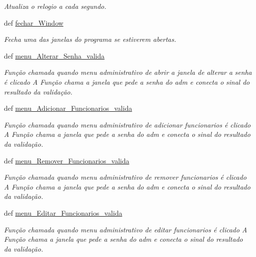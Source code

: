 \begin{DoxyCompactItemize}
\begin{DoxyCompactList}\small\item\em \-Atualiza o relogio a cada segundo. \end{DoxyCompactList}\item 
def \hyperlink{classview_1_1Controle__De__Acesso__Window_acefc417c66ea7c38870ad3cc66122b62}{fechar\-\_\-\-Window}
\begin{DoxyCompactList}\small\item\em \-Fecha uma das janelas do programa se estiverem abertas. \end{DoxyCompactList}\item 
def \hyperlink{classview_1_1Controle__De__Acesso__Window_a86bf25d63c46769e18d83865589d89d2}{menu\-\_\-\-Alterar\-\_\-\-Senha\-\_\-valida}
\begin{DoxyCompactList}\small\item\em \-Função chamada quando menu administrativo de abrir a janela de alterar a senha é clicado \-A \-Função chama a janela que pede a senha do adm e conecta o sinal do resultado da validação. \end{DoxyCompactList}\item 
def \hyperlink{classview_1_1Controle__De__Acesso__Window_ab7f3597c51cdb5a4e6346758207e219f}{menu\-\_\-\-Adicionar\-\_\-\-Funcionarios\-\_\-valida}
\begin{DoxyCompactList}\small\item\em \-Função chamada quando menu administrativo de adicionar funcionarios é clicado \-A \-Função chama a janela que pede a senha do adm e conecta o sinal do resultado da validação. \end{DoxyCompactList}\item 
def \hyperlink{classview_1_1Controle__De__Acesso__Window_aa9be804aff65d323b11016db919c1a75}{menu\-\_\-\-Remover\-\_\-\-Funcionarios\-\_\-valida}
\begin{DoxyCompactList}\small\item\em \-Função chamada quando menu administrativo de remover funcionarios é clicado \-A \-Função chama a janela que pede a senha do adm e conecta o sinal do resultado da validação. \end{DoxyCompactList}\item 
def \hyperlink{classview_1_1Controle__De__Acesso__Window_a82913b54a58fa3d3cc2f8779087d0387}{menu\-\_\-\-Editar\-\_\-\-Funcionarios\-\_\-valida}
\begin{DoxyCompactList}\small\item\em \-Função chamada quando menu administrativo de editar funcionarios é clicado \-A \-Função chama a janela que pede a senha do adm e conecta o sinal do resultado da validação. \end{DoxyCompactList}\item 

\end{DoxyCompactItemize}
